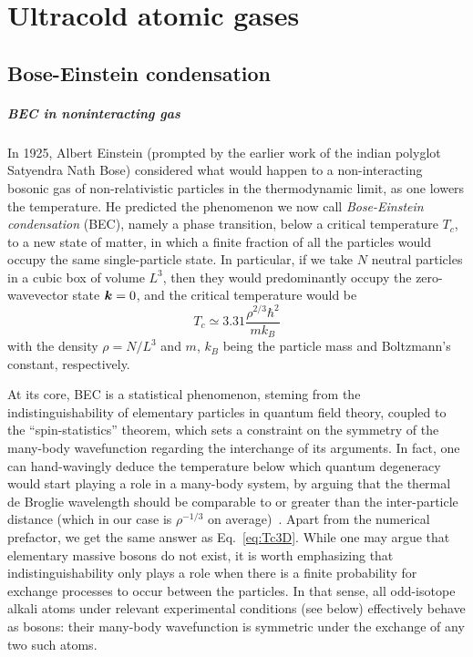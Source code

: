 \chapter{Ultracold atomic gases}
\label{cha:cold-gases}

\section{Bose-Einstein condensation}
\label{sec:BEC}


\paragraph{BEC in noninteracting gas}
In 1925, Albert Einstein (prompted by the earlier work of the indian
polyglot Satyendra Nath Bose) considered what would happen to a
non-interacting bosonic gas of non-relativistic particles in the
thermodynamic limit, as one lowers the temperature. He predicted the
phenomenon we now call \textit{Bose-Einstein condensation} (BEC),
namely a phase transition, below a critical temperature $T_c$, to a
new state of matter, in which a finite fraction of all the particles
would occupy the same single-particle state. In particular, if we take
$N$ neutral particles in a cubic box of volume $L^3$, then they would
predominantly occupy the zero-wavevector state $\bm{k} = 0$, and the
critical temperature would be~\cite{9780198507192}
%
\begin{equation}\label{eq:Tc3D}
  T_c \simeq 3.31 \frac{\rho^{2/3}\hbar^2}{m k_B}
\end{equation}
%
with the density $\rho = N/L^3$ and $m$, $k_B$ being the particle
mass and Boltzmann's constant, respectively.

At its core, BEC is a statistical phenomenon, steming from the
indistinguishability of elementary particles in quantum field theory,
coupled to the ``spin-statistics'' theorem, which sets a constraint on
the symmetry of the many-body wavefunction regarding the interchange
of its arguments. In fact, one can hand-wavingly deduce the
temperature below which quantum degeneracy would start playing a role
in a many-body system, by arguing that the thermal de Broglie
wavelength should be comparable to or greater than the inter-particle
distance (which in our case is $\rho^{-1/3}$ on
average)~\cite{Leggett_1999}. Apart from the numerical prefactor, we
get the same answer as Eq.~\eqref{eq:Tc3D}. While one may argue that
elementary massive bosons do not exist, it is worth emphasizing that
indistinguishability only plays a role when there is a finite
probability for exchange processes to occur between the particles. In
that sense, all odd-isotope alkali atoms under relevant experimental
conditions (see below) effectively behave as bosons: their many-body
wavefunction is symmetric under the exchange of any two such atoms.


